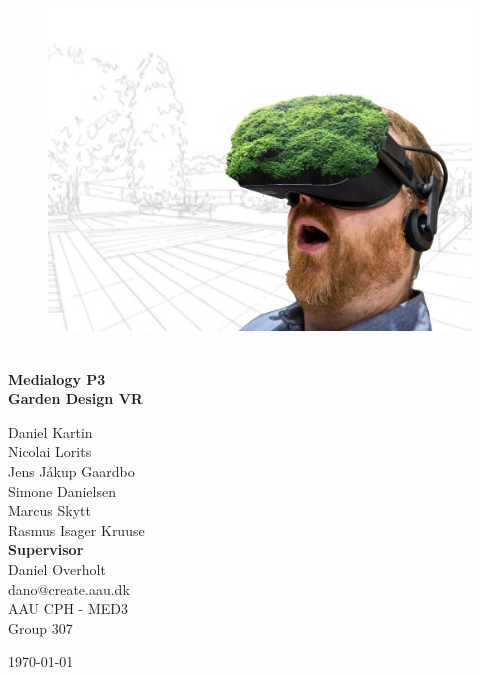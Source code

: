 \begin{titlepage}
			
\addtolength{\voffset}{2cm}

\begin{figure}[H]
\centering
\vspace{2cm}	%
\includegraphics[width=0.99\linewidth]{figure/Frontpage/gardenposterCropped.png}
\end{figure}

\mbox{}
\vfill
\renewcommand{\familydefault}{\sfdefault} \normalfont %
\HRule\\[0.2cm]
\textbf{{\small Medialogy P3\\ \Huge Garden Design VR}}\\
\HRule\medskip{}
\begin{multicols}{2}
{\Large Daniel Kartin\vspace{0.3mm}\\Nicolai Lorits\\Jens Jákup Gaardbo\\Simone Danielsen\\Marcus Skytt\\Rasmus Isager Kruuse\columnbreak}\\
\setlength{\parskip}{2.4cm}
\Large{\textbf{Supervisor}\\Daniel Overholt\\dano@create.aau.dk}
\\\small AAU CPH - 
MED3 \\
Group 307\\
\end{multicols}
\today
\renewcommand{\familydefault}{\rmdefault} \normalfont %
\end{titlepage}


